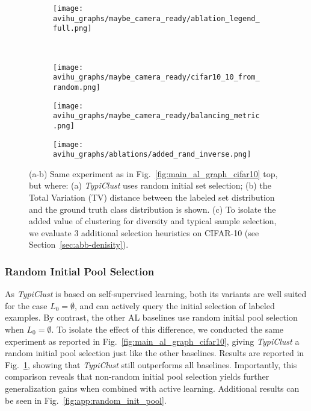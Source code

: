 \documentclass{article}
\begin{document}
\begin{figure}[htb]

\begin{subfigure}{.48\textwidth}
  \centering
 \texttt{[image: avihu\_graphs/maybe\_camera\_ready/ablation\_legend\_full.png]}
\end{subfigure}
\\
\begin{subfigure}{.157\textwidth}
  \centering
 \texttt{[image: avihu\_graphs/maybe\_camera\_ready/cifar10\_10\_from\_random.png]}
\caption{}

\label{fig:cifar10_random_init}
\end{subfigure}
\begin{subfigure}{.157\textwidth}
  \centering
 \texttt{[image: avihu\_graphs/maybe\_camera\_ready/balancing\_metric.png]}
\caption{}
\label{fig:balancing_metric}
\end{subfigure}
\begin{subfigure}{.157\textwidth}
  \centering
   \texttt{[image: avihu\_graphs/ablations/added\_rand\_inverse.png]}
\caption{}
\label{fig:scores_ablation}
\end{subfigure}

\vspace{-.2cm}
\caption{(a-b) Same experiment as in Fig.~\ref{fig:main_al_graph_cifar10} top, but where: (a) \emph{TypiClust} uses random initial set selection; (b) the Total Variation (TV) distance between the labeled set distribution and the ground truth class distribution is shown. 
(c) To isolate the added value of clustering for diversity and typical sample selection, we evaluate 3 additional selection heuristics on CIFAR-10 (see Section~\ref{sec:abb-denisity}).}
  \label{fig:agreement_testics}
\vspace{-0.25cm}
\end{figure}


\subsubsection{Random Initial Pool Selection}
\label{sec:starting_from_random}

As \textit{TypiClust} is based on self-supervised learning, both its variants are well suited for the case $L_0=\emptyset$, and can actively query the initial selection of labeled examples. By contrast, the other AL baselines use random initial pool selection when $L_0=\emptyset$. To isolate the effect of this difference, we conducted  the same experiment as reported in Fig.~\ref{fig:main_al_graph_cifar10}, giving \emph{TypiClust} a random initial pool selection just like the other baselines. Results are reported in  Fig.~\ref{fig:cifar10_random_init}, showing that \emph{TypiClust} still outperforms all baselines. Importantly, this comparison reveals that non-random initial pool selection yields further generalization gains when combined with active learning. Additional results can be seen in Fig.~\ref{fig:app:random_init_pool}.
\end{document}

